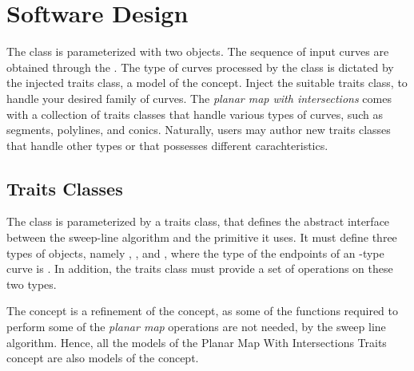 \section{Software Design}

The  class is parameterized with
two objects. The sequence of input curves are obtained through the
. The type of curves processed by the
 class is dictated
by the injected traits class, a model of the 
concept. Inject the suitable traits class, to handle your desired family of
curves. The {\em planar map with intersections} comes with a collection of
traits classes that handle various types of curves, such as segments,
polylines, and conics. Naturally, users may author new traits classes
that handle other types or that possesses different carachteristics.


\subsection{Traits Classes}
The  class is parameterized by a
traits class, that defines the abstract interface between the sweep-line
algorithm and the primitive it uses. It must define three types of objects,
namely , , and ,
where the type of the endpoints of an -type curve
is . In addition, the traits class must provide a set of
operations on these two types.

The  concept is a refinement of the 
 concept, as some of the functions required to
perform some of the {\em planar map} operations are not needed, by the sweep
line algorithm. Hence, all the models of the
Planar Map With Intersections Traits 
concept are also models of the  concept. 

